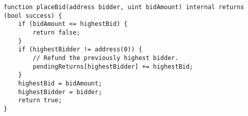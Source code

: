 \begin{lstlisting}[language=Solidity]
function placeBid(address bidder, uint bidAmount) internal returns (bool success) {
	if (bidAmount <= highestBid) {
		return false;
	}
	if (highestBidder != address(0)) {
		// Refund the previously highest bidder.
		pendingReturns[highestBidder] += highestBid;
	}
	highestBid = bidAmount;
	highestBidder = bidder;
	return true;
}
\end{lstlisting}